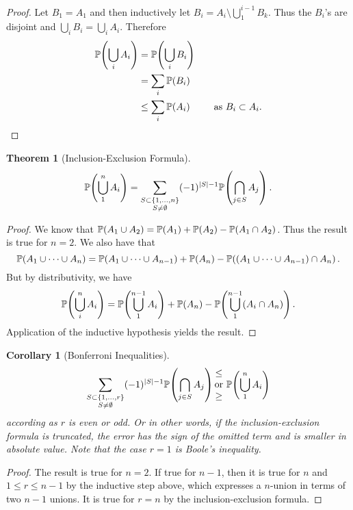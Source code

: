 \documentclass{notes}
\theoremstyle{plain}
\newtheorem{theorem}{Theorem}[chapter]
\newtheorem*{corollary}{Corollary}
\newcommand{\bP}{\mathbb{P}}
\newcommand{\prob}[1]{\bP \negthinspace\left(#1\right)}
\begin{document}
\begin{proof}
Let $B_1 = A_1$ and then inductively let $B_i = A_i \setminus 
\bigcup_1^{i-1} B_k$.  Thus the $B_i$'s are disjoint and
$\bigcup_i B_i = \bigcup_i A_i$.  Therefore
\begin{align*}
\prob{\bigcup_i A_i} &= \prob{\bigcup_i B_i} \\
&=\sum_i \prob{B_i} \\
&\le \sum_i \prob{A_i} \qquad \text{ as } B_i \subset A_i.
\end{align*}
\end{proof}

\begin{theorem}[Inclusion-Exclusion Formula]
\[
\prob{\bigcup_1^n A_i} = \sum_{\substack{S \subset \{1, \dots, n\} \\
S \neq \emptyset}}
 (-1)^{\abs{S} - 1} \prob{\bigcap_{j \in S} A_j}.
\]
\end{theorem}

\begin{proof}
We know that $\prob{A_1 \cup A_2} = \prob{A_1} + \prob{A_2} - 
\prob{A_1 \cap A_2}$.  Thus the result is true for $n=2$.  We also have that
\[
\prob{A_1 \cup \dots \cup A_n} = \prob{A_1 \cup \dots 
\cup A_{n-1}} + \prob{A_n} - \prob{(A_1 \cup \dots \cup A_{n-1}) \cap A_n}.
\]
But by distributivity, we have
\[
\prob{\bigcup_i^n A_i} = \prob{\bigcup_1^{n-1} A_i} + \prob{A_n}
- \prob{\bigcup_1^{n-1} (A_i \cap A_n)}.
\]
Application of the inductive hypothesis yields the result.
\end{proof}

\begin{corollary}[Bonferroni Inequalities]
\[
\sum_{\substack{S \subset \{1, \dots, r\} \\
S \neq \emptyset}} (-1)^{\abs{S} - 1} \prob{\bigcap_{j \in S} A_j}
\begin{matrix} \le \\ \text{or} \\ \ge \end{matrix} \ 
\prob{\bigcup_1^n A_i}
\]
according as $r$ is even or odd.  Or in other words, if the 
inclusion-exclusion formula is truncated, the error has the sign of the
omitted term and is smaller in absolute value.  Note that the case $r=1$
is Boole's inequality.
\end{corollary}

\begin{proof}
The result is true for $n=2$.  If true for $n-1$, then it is true for $n$
and $1 \le r \le n-1$ by the inductive step above, which expresses a
$n$-union in terms of two $n-1$ unions.  It is true for $r=n$ by the 
inclusion-exclusion formula.
\end{proof}
\end{document}
